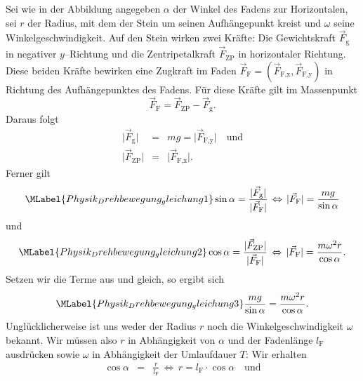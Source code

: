 \begin{MExercises}
\begin{MExercise}
 
  
  \begin{MSolution}
  Sei wie in der Abbildung angegeben $\alpha$ der Winkel des Fadens zur Horizontalen, sei $r$ der Radius, mit dem der Stein um seinen Aufh\"angepunkt kreist und $\omega$ seine Winkelgeschwindigkeit. Auf den Stein wirken zwei Kr\"afte: Die Gewichtskraft $\vec{F}_{\textrm{g}}$ in negativer $y$--Richtung und die Zentripetalkraft $\vec{F}_{\textrm{ZP}}$ in horizontaler Richtung. Diese beiden Kr\"afte bewirken eine Zugkraft im Faden $\vec{F}_{\textrm{F}}=(\vec{F}_{\textrm{F,x}},\vec{F}_{\textrm{F,y}})$ in Richtung des Aufh\"angepunktes des Fadens. F\"ur diese Kr\"afte gilt im Massenpunkt 
  \begin{equation*}
  \vec{F}_{\textrm{F}}=\vec{F}_{\textrm{ZP}}-\vec{F}_{\textrm{g}}.
  \end{equation*}
  Daraus folgt
  \begin{eqnarray*}
  \vert\vec{F}_{\textrm{g}}\vert&=&mg=\vert\vec{F}_{\textrm{F,y}}\vert\quad\text{und}\\
  \vert\vec{F}_{\textrm{ZP}}\vert&=&\vert\vec{F}_{\textrm{F,x}}\vert.
  \end{eqnarray*} Ferner gilt
  \begin{equation}\MLabel{Physik_Drehbewegung_gleichung1}
  \sin\alpha=\frac{\vert\vec{F}_{\textrm{g}}\vert}{\vert\vec{F}_{\textrm{F}}\vert}\,\Leftrightarrow\, \vert\vec{F}_{\textrm{F}}\vert=\frac{mg}{\sin\alpha} 
  \end{equation} und
  \begin{equation}\MLabel{Physik_Drehbewegung_gleichung2}
  \cos\alpha=\frac{\vert\vec{F}_{\textrm{ZP}}\vert}{\vert\vec{F}_{\textrm{F}}\vert}\,\Leftrightarrow\, \vert\vec{F}_{\textrm{F}}\vert=\frac{m\omega^2r}{\cos\alpha}.
  \end{equation} Setzen wir die Terme aus  und  gleich, so ergibt sich
  \begin{equation}\MLabel{Physik_Drehbewegung_gleichung3}
  \frac{mg}{\sin\alpha}=\frac{m\omega^2r}{\cos\alpha}.
  \end{equation} Ungl\"ucklicherweise ist uns weder der Radius $r$ noch die Winkelgeschwindigkeit $\omega$ bekannt. Wir m\"ussen also $r$ in Abh\"angigkeit von $\alpha$ und der Fadenl\"ange $l_{\textrm{F}}$ ausdr\"ucken sowie $\omega$ in Abh\"angigkeit der Umlaufdauer $T$: Wir erhalten
  \begin{eqnarray*}
    \cos\alpha&=&\frac{r}{l_{\textrm{F}}}\,\Leftrightarrow\, r=l_{\textrm{F}}\cdot\cos\alpha\quad\text{und}\\

\end{eqnarray*}
\end{MSolution}
\end{MExercise}
\end{MExercises}

